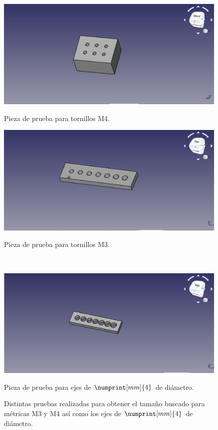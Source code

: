 \begin{figure}[H]
    \centering
    \begin{minipage}{.48\linewidth}
        \centering
        \includegraphics[width=\linewidth]{pictures/LadrilloPrueba.png}
        \caption{Pieza de prueba para tornillos M4.}
        \label{fig:prueba_m4}
    \end{minipage}
    \hfill
    \begin{minipage}{.48\linewidth}
        \centering
        \includegraphics[width=\linewidth]{pictures/PruebaM3.png}
        \caption{Pieza de prueba para tornillos M3.}
        \label{fig:prueba_m3}
    \end{minipage}
    \\[1ex]
    \begin{minipage}{.7\linewidth}
        \centering
        \includegraphics[width=\linewidth]{pictures/PruebaEje.png}
        \caption{Pieza de prueba para ejes de $\numprint[mm]{4}$ de diámetro.}
        \label{fig:prueba_eje}
    \end{minipage}
    \caption{Distintas pruebas realizadas para obtener el tamaño buscado para %
    métricas M3 y M4 así como los ejes de $\numprint[mm]{4}$ de diámetro.}
    \label{fig:diam_tests}
\end{figure}

